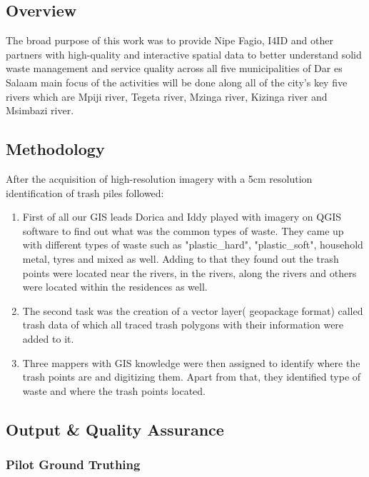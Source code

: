 \documentclass[a4paper,12pt,twoside]{article}
\begin{document}
\subsection{Overview}
The broad purpose of this work was to provide Nipe Fagio, I4ID and other partners with high-quality and interactive spatial data to better understand solid waste management and service quality across all five municipalities of Dar es Salaam main focus of the activities will be done along all of the city’s key five rivers which are Mpiji river, Tegeta river, Mzinga river, Kizinga river and Msimbazi river.

\subsection{Methodology}
    After the acquisition of high-resolution imagery with a 5cm resolution identification of trash piles followed:
    
    \begin{enumerate}
        \item First of all our GIS leads Dorica and Iddy played with imagery on QGIS software to find out what was the common types of waste. They came up with different types of waste such as "plastic_hard", "plastic_soft", household metal, tyres and mixed as well.
        Adding to that they found out the trash points were located near the rivers, in the rivers, along the rivers and others were located within the residences as well.
        \item The second task was the creation of a vector layer( geopackage format) called trash data of which all traced trash polygons with their information were added to it. \item Three mappers with GIS knowledge were then assigned to identify where the trash points are and digitizing them. Apart from that, they identified type of waste and where the trash points located.
    \end{enumerate}
    

\subsection{Output & Quality Assurance}

    \begin{multicols}{2}
    \lipsum[0-5]
    \end{multicols}
    
\subsubsection{Pilot Ground Truthing}
\end{document}
